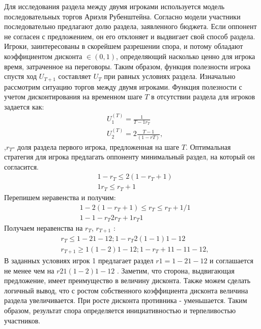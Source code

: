 Для исследования раздела между двумя игроками используется модель последовательных торгов Ариэля Рубенштейна.
Согласно модели участники последовательно предлагают долю раздела, заявленного бюджета.
Если оппонент не согласен с предложением, он его отклоняет и выдвигает свой способ раздела. 
Игроки, заинтересованы в скорейшем разрешении спора, и потому обладают коэффициентом дисконта  $\in (0,1)$, определяющий насколько ценно для игрока время, затраченное на переговоры.
Таким образом, функция полезности игрока спустя ход $U_{T+1}$ составляет $U_T$ при равных условиях раздела.
Изначально рассмотрим ситуацию торгов между двумя игроками. Функция полезности с учетом дисконтирования на временном шаге $T$ в отсутствии раздела для игроков задается как:
\begin{equation}
	\begin{aligned}
		&U_1^{(T)}= \frac{1}{T-1r_T}  \\
		&U_2^{(T)}=2\frac{T-1}{(1-rT)},
	\end{aligned}
\end{equation}
,$r_T$- доля раздела первого игрока, предложенная на шаге $T$.
Оптимальная стратегия для игрока предлагать оппоненту минимальный раздел, на который он согласится. 
\begin{equation}
	\begin{aligned}
		&1 - r_T  \le 2(1-r_T+1)  \\
		&1 r_T  \le r_T+1 
	\end{aligned}
\end{equation}
Перепишем неравенства и получим:
\begin{equation}
	\begin{aligned}
		&1-2(1-r_T+1) \le r_T \le r_{T}+1 /1 \\
		&1-1-r_T2r_T+1r_T1 
	\end{aligned}
\end{equation}
Получаем неравенства на $r_T$, $r_{T+1}$ :
\begin{equation}
	\begin{aligned}
		&r_T \le 1-2 1-12 ;1 -r_T 2(1-1)1-1 2 \\
		&r_{T+1} \ge  1(1-2)1-12 ; 1 -r_T+1 1-11-1 2,
	\end{aligned}
\end{equation}
В заданных условиях игрок 1 предлагает раздел $r1=1-2 1-12$  и соглашается не менее чем на $r2 1(1-2)1-12$ .
Заметим, что сторона, выдвигающая предложение, имеет преимущество в величину дисконта. Также можем сделать логичный вывод, что с ростом собственного коэффициента дисконта величина раздела увеличивается. При росте дисконта противника - уменьшается. Таким образом, результат спора определяется инициативностью и терпеливостью участников.
